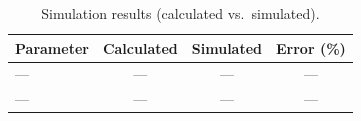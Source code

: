 \begin{table}[!htbp]
\centering
\caption{Simulation results (calculated vs.\ simulated).}
\label{tab:sim-results}
\begin{tabularx}{\textwidth}{@{}Xccc@{}}
\toprule
\textbf{Parameter} & \textbf{Calculated} & \textbf{Simulated} & \textbf{Error (\%)} \\
\midrule
--- & --- & --- & --- \\
--- & --- & --- & --- \\
\bottomrule
\end{tabularx}
\end{table}

\noindent{}

